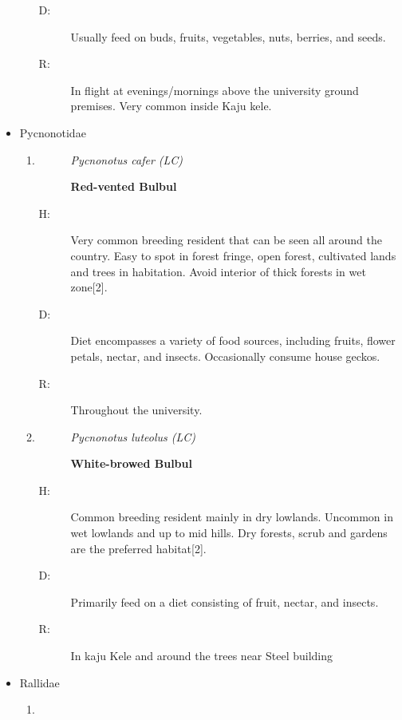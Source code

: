 \begin{itemize}
\begin{enumerate}
\begin{description}
\item[D: ]%
Usually feed on buds, fruits, vegetables, nuts, berries, and seeds.%
\item[R: ]%
In flight at evenings/mornings above the university ground premises. Very common inside Kaju kele.%
\end{description}%
\end{enumerate}%
\item%
Pycnonotidae%
\begin{enumerate}%
\item%
\begin{description}%
\item[]%
\textit{Pycnonotus cafer (LC)}%
\item[]%
\textbf{Red{-}vented Bulbul}%
\end{description}%
\begin{description}%
\item[H: ]%
Very common breeding resident that can be seen all around the country. Easy to spot in forest fringe, open forest, cultivated lands and trees in habitation.  Avoid interior of thick forests in wet zone{[}2{]}.%
\item[D: ]%
Diet encompasses a variety of food sources, including fruits, flower petals, nectar, and insects. Occasionally consume house geckos.%
\item[R: ]%
Throughout the university.%
\end{description}%
\item%
\begin{description}%
\item[]%
\textit{Pycnonotus luteolus (LC)}%
\item[]%
\textbf{White{-}browed Bulbul}%
\end{description}%
\begin{description}%
\item[H: ]%
Common breeding resident mainly in dry lowlands. Uncommon in wet lowlands and up to mid hills. Dry forests, scrub and gardens are the preferred habitat{[}2{]}.%
\item[D: ]%
Primarily feed on a diet consisting of fruit, nectar, and insects.%
\item[R: ]%
In kaju Kele and around the trees near Steel building%
\end{description}%
\end{enumerate}%
\item%
Rallidae%
\begin{enumerate}%
\item%
\begin{description}%

\end{description}
\end{enumerate}
\end{itemize}
